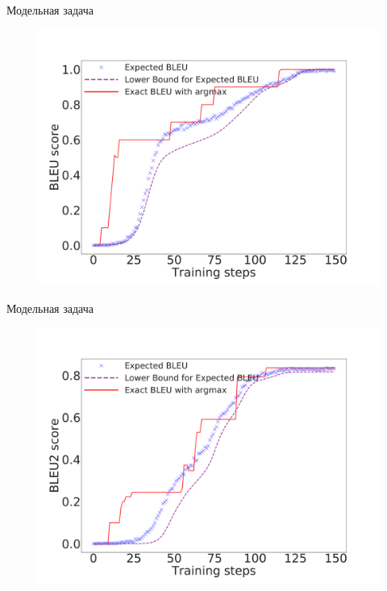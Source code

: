\documentclass{beamer}					%
\begin{document}
    \begin{frame}{Модельная задача}
        \begin{figure}[h]
            \centering
            \includegraphics[scale=0.2]{BLEU_old.pdf}
            \label{fig:bleu_toy}
        \end{figure}
    \end{frame}
      
    \begin{frame}{Модельная задача}
        \begin{figure}[h]
            \centering
            \includegraphics[scale=0.2]{BLEU2_old.pdf}
            \label{fig:bleu2_toy}
        \end{figure}
    \end{frame}
\end{document}
